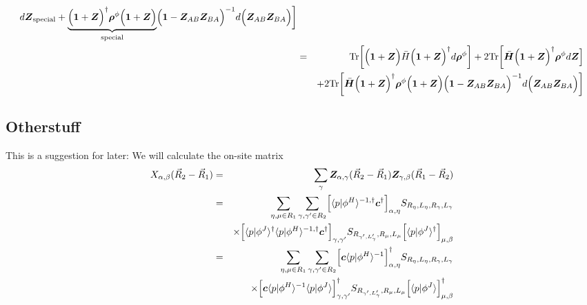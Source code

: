\documentclass[11pt,a4paper]{report}
\begin{document}
\begin{eqnarray}
{d\mat{Z}}_{\text{special}}
+
\underbrace{
\Bigl(\mat{1}+\mat{Z}\Bigr)^\dagger\mat{\rho}^\phi \Bigl(\mat{1}+\mat{Z}\Bigr)
}_{\text{special}}
\Bigl(\mat{1}-\mat{Z}_{AB}\mat{Z}_{BA}\Bigr)^{-1}
d\Bigl(\mat{Z}_{AB}\mat{Z}_{BA}\Bigr)
\biggr]
\nonumber\\
%
%
%
&=&\Tr\biggl[\Bigl(\mat{1}+\mat{Z}\Bigr)
\bar{H}
\Bigl(\mat{1}+\mat{Z}\Bigr)^\dagger d\mat{\rho}^\phi\biggr]
+
2\Tr\biggl[
\bar{\mat{H}}
\Bigl(\mat{1}+\mat{Z}\Bigr)^\dagger
\mat{\rho}^\phi
d\mat{Z}\Bigr]
\nonumber\\
&&+
2\Tr\biggl[
\bar{\mat{H}}
\Bigl(\mat{1}+\mat{Z}\Bigr)^\dagger
\mat{\rho}^\phi
\Bigl(\mat{1}+\mat{Z}\Bigr)
\Bigl(\mat{1}-\mat{Z}_{AB}\mat{Z}_{BA}\Bigr)^{-1}
d\Bigl(\mat{Z}_{AB}\mat{Z}_{BA}\Bigr)
\biggr]
\end{eqnarray}

\subsection{Otherstuff}
This is a suggestion for later: We will calculate the on-site matrix
\begin{eqnarray}
X_{\alpha,\beta}(\vec{R}_2-\vec{R}_1)
&=&
\sum_\gamma \mat{Z}_{\alpha,\gamma}(\vec{R}_2-\vec{R}_1)
\mat{Z}_{\gamma,\beta}(\vec{R}_1-\vec{R}_2)
\nonumber\\
%
%
%
&=&\sum_{\eta,\mu\in R_1}\sum_{\gamma,\gamma'\in R_2}
\Bigl[
\langle{p}|\phi^H\rangle^{-1,\dagger}\mat{c}^\dagger\Bigr]_{\alpha,\eta}
S_{R_\eta,L_\eta,R_\gamma,L_\gamma}
\nonumber\\
&&\times\Bigl[
\langle{p}|\phi^J\rangle^\dagger
\langle{p}|\phi^H\rangle^{-1,\dagger}
\mat{c}^\dagger
\Bigr]_{\gamma,\gamma'}
S_{R_{\gamma',L_\gamma'},R_\mu,L_\mu}
\Bigl[\langle{p}|\phi^J\rangle^\dagger\Bigr]_{\mu,\beta}
\nonumber\\
%
%
%
&=&\sum_{\eta,\mu\in R_1}\sum_{\gamma,\gamma'\in R_2}
\Bigl[
\mat{c}\langle{p}|\phi^H\rangle^{-1}
\Bigr]^\dagger_{\alpha,\eta}
S_{R_\eta,L_\eta,R_\gamma,L_\gamma}
\nonumber\\
&&\times\Bigl[
\mat{c}
\langle{p}|\phi^H\rangle^{-1}
\langle{p}|\phi^J\rangle
\Bigr]^\dagger_{\gamma,\gamma'}
S_{R_{\gamma',L_\gamma'},R_\mu,L_\mu}
\Bigl[\langle{p}|\phi^J\rangle\Bigr]^\dagger_{\mu,\beta}
\end{eqnarray}
\end{document}
